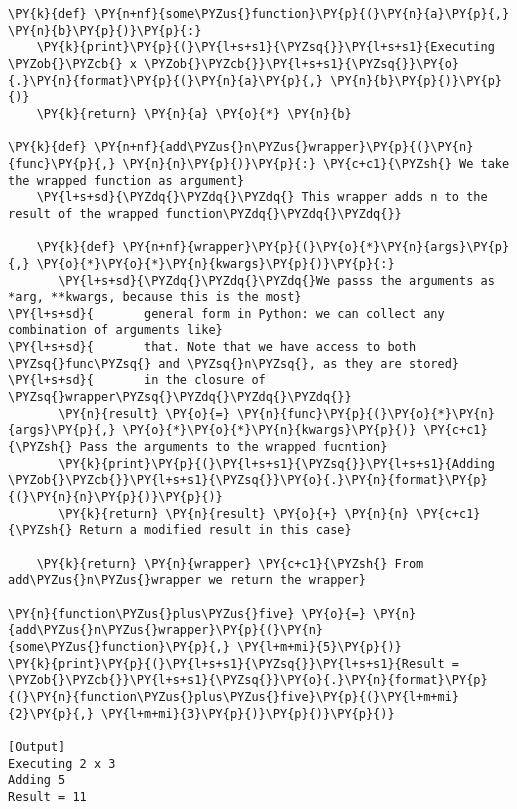 \begin{Verbatim}[label=\makebox{\url{https://github.com/lucabaldini/cmepda/tree/master/slides/latex/snippets/wrapper.py}},commandchars=\\\{\}]
\PY{k}{def} \PY{n+nf}{some\PYZus{}function}\PY{p}{(}\PY{n}{a}\PY{p}{,} \PY{n}{b}\PY{p}{)}\PY{p}{:}
    \PY{k}{print}\PY{p}{(}\PY{l+s+s1}{\PYZsq{}}\PY{l+s+s1}{Executing \PYZob{}\PYZcb{} x \PYZob{}\PYZcb{}}\PY{l+s+s1}{\PYZsq{}}\PY{o}{.}\PY{n}{format}\PY{p}{(}\PY{n}{a}\PY{p}{,} \PY{n}{b}\PY{p}{)}\PY{p}{)}
    \PY{k}{return} \PY{n}{a} \PY{o}{*} \PY{n}{b}
    
\PY{k}{def} \PY{n+nf}{add\PYZus{}n\PYZus{}wrapper}\PY{p}{(}\PY{n}{func}\PY{p}{,} \PY{n}{n}\PY{p}{)}\PY{p}{:} \PY{c+c1}{\PYZsh{} We take the wrapped function as argument}
    \PY{l+s+sd}{\PYZdq{}\PYZdq{}\PYZdq{} This wrapper adds n to the result of the wrapped function\PYZdq{}\PYZdq{}\PYZdq{}}
    
    \PY{k}{def} \PY{n+nf}{wrapper}\PY{p}{(}\PY{o}{*}\PY{n}{args}\PY{p}{,} \PY{o}{*}\PY{o}{*}\PY{n}{kwargs}\PY{p}{)}\PY{p}{:} 
       \PY{l+s+sd}{\PYZdq{}\PYZdq{}\PYZdq{}We passs the arguments as *arg, **kwargs, because this is the most}
\PY{l+s+sd}{       general form in Python: we can collect any combination of arguments like}
\PY{l+s+sd}{       that. Note that we have access to both \PYZsq{}func\PYZsq{} and \PYZsq{}n\PYZsq{}, as they are stored}
\PY{l+s+sd}{       in the closure of \PYZsq{}wrapper\PYZsq{}\PYZdq{}\PYZdq{}\PYZdq{}}
       \PY{n}{result} \PY{o}{=} \PY{n}{func}\PY{p}{(}\PY{o}{*}\PY{n}{args}\PY{p}{,} \PY{o}{*}\PY{o}{*}\PY{n}{kwargs}\PY{p}{)} \PY{c+c1}{\PYZsh{} Pass the arguments to the wrapped fucntion}
       \PY{k}{print}\PY{p}{(}\PY{l+s+s1}{\PYZsq{}}\PY{l+s+s1}{Adding \PYZob{}\PYZcb{}}\PY{l+s+s1}{\PYZsq{}}\PY{o}{.}\PY{n}{format}\PY{p}{(}\PY{n}{n}\PY{p}{)}\PY{p}{)}
       \PY{k}{return} \PY{n}{result} \PY{o}{+} \PY{n}{n} \PY{c+c1}{\PYZsh{} Return a modified result in this case}
       
    \PY{k}{return} \PY{n}{wrapper} \PY{c+c1}{\PYZsh{} From add\PYZus{}n\PYZus{}wrapper we return the wrapper}

\PY{n}{function\PYZus{}plus\PYZus{}five} \PY{o}{=} \PY{n}{add\PYZus{}n\PYZus{}wrapper}\PY{p}{(}\PY{n}{some\PYZus{}function}\PY{p}{,} \PY{l+m+mi}{5}\PY{p}{)}
\PY{k}{print}\PY{p}{(}\PY{l+s+s1}{\PYZsq{}}\PY{l+s+s1}{Result = \PYZob{}\PYZcb{}}\PY{l+s+s1}{\PYZsq{}}\PY{o}{.}\PY{n}{format}\PY{p}{(}\PY{n}{function\PYZus{}plus\PYZus{}five}\PY{p}{(}\PY{l+m+mi}{2}\PY{p}{,} \PY{l+m+mi}{3}\PY{p}{)}\PY{p}{)}\PY{p}{)}

[Output]
Executing 2 x 3
Adding 5
Result = 11
\end{Verbatim}